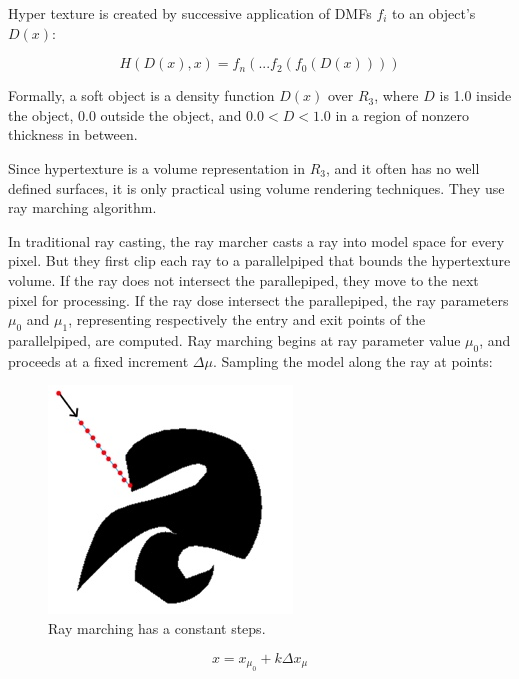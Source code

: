Hyper texture is created by successive application of DMFs $f_{i}$ to an object's $D(x)$:

\begin{equation}
	H(D(x),x)=f_{n}(...f_{2}(f_{0}(D(x))))
\end{equation}

Formally, a soft object is a density function $D(x)$ over $R_{3}$, where  $D$ is 1.0 inside the object, 0.0 outside the object, and $0.0<D<1.0$ in a region of nonzero thickness in between.

Since hypertexture is a volume representation in $R_{3}$, and it often has no well defined surfaces, it is only practical using volume rendering techniques. They use ray marching algorithm.

In traditional ray casting, the ray marcher casts a ray into model space for every pixel. But they first clip each ray to a parallelpiped that bounds the hypertexture volume. If the ray does not intersect the parallepiped, they move to the next pixel for processing. If the ray dose intersect the parallepiped, the ray parameters $\mu_{0}$ and $\mu_{1}$, representing respectively the entry and exit points of the parallelpiped, are computed. Ray marching begins at ray parameter value $\mu_{0}$, and proceeds at a fixed increment $\Delta\mu$. Sampling the model along the ray at points:

\begin{figure}
\sidecaption
	\includegraphics[width=.65\textwidth]{graphics/df/ray-marching}
	\caption{Ray marching has a constant steps.}
\end{figure}

\begin{equation}
	x=x_{\mu_{0}}+k\Delta x_{\mu}
\end{equation} 

